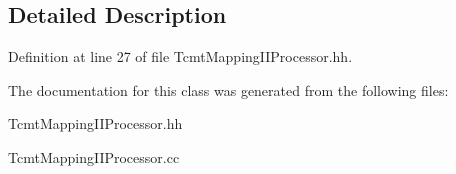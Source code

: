\subsection{Detailed Description}


Definition at line 27 of file TcmtMappingIIProcessor.hh.

The documentation for this class was generated from the following files:\begin{DoxyCompactItemize}
\item 
TcmtMappingIIProcessor.hh\item 
TcmtMappingIIProcessor.cc\end{DoxyCompactItemize}
